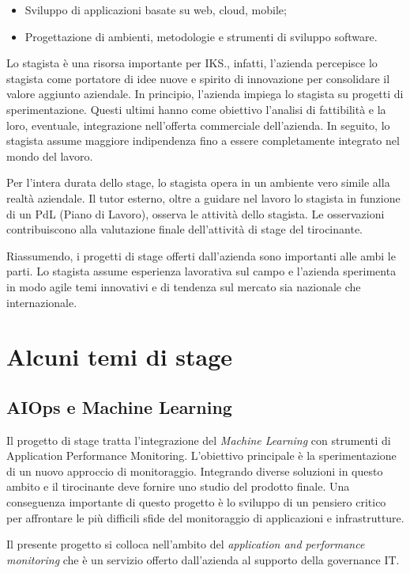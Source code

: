 \begin{itemize}
	\item Sviluppo di applicazioni basate su web, \gls{cloud}, mobile;
	\item Progettazione di ambienti, metodologie e strumenti di 
	      sviluppo software.
\end{itemize}

Lo stagista è una risorsa importante per IKS., infatti, l'azienda percepisce 
lo stagista come portatore di idee nuove e spirito di innovazione per consolidare 
il valore aggiunto aziendale. In principio, l'azienda impiega lo stagista su progetti 
di sperimentazione. Questi ultimi hanno come obiettivo l'analisi di 
fattibilità e la loro, eventuale, integrazione nell'offerta commerciale dell'azienda. 
In seguito, lo stagista assume maggiore indipendenza fino a essere completamente integrato
nel mondo del lavoro.

Per l'intera durata dello stage, lo stagista opera in un ambiente vero 
simile alla realtà aziendale. Il tutor esterno, oltre a guidare nel lavoro 
lo stagista in funzione di un PdL (Piano di Lavoro), osserva le attività 
dello stagista. Le osservazioni contribuiscono alla valutazione finale 
dell'attività di stage del tirocinante.

Riassumendo, i progetti di stage offerti dall'azienda sono importanti alle 
ambi le parti. Lo stagista assume esperienza lavorativa sul campo e l'azienda 
sperimenta in modo agile temi innovativi e di tendenza sul mercato sia 
nazionale che internazionale.


\section{Alcuni temi di stage}
\subsection{AIOps e Machine Learning}
Il progetto di stage tratta l'integrazione del \textit{Machine Learning} 
con strumenti di Application Performance Monitoring. L'obiettivo principale è la sperimentazione
di un nuovo approccio di monitoraggio. Integrando diverse soluzioni in questo ambito e 
il tirocinante deve fornire uno studio del prodotto finale. Una conseguenza importante di 
questo progetto è lo sviluppo di un pensiero critico per affrontare le più difficili sfide 
del monitoraggio di applicazioni e infrastrutture. 

Il presente progetto si colloca nell'ambito del 
\textit{application and performance monitoring} che è un 
servizio offerto dall'azienda al supporto della governance IT. 



